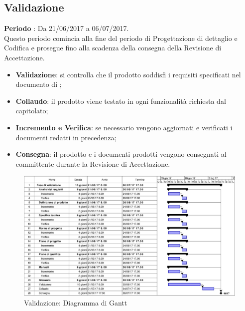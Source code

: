\documentclass[../PianoDiProgetto.tex]{subfiles}
\begin{document}
		\subsection{Validazione}
		\textbf{Periodo} : Da 21/06/2017 a 06/07/2017. \\
		Questo periodo comincia alla fine del periodo di Progettazione di dettaglio e Codifica e prosegue fino alla scadenza della consegna della Revisione di Accettazione.
		\begin{itemize}
			\item \textbf{Validazione}: si controlla che il prodotto soddisfi i requisiti specificati nel documento di \analisideirequisiti ;
			\item \textbf{Collaudo}: il prodotto viene testato in ogni funzionalità richiesta dal capitolato;
			\item \textbf{Incremento e Verifica}: se necessario vengono aggiornati e verificati i documenti redatti in precedenza;
			\item \textbf{Consegna}: il prodotto e i documenti prodotti vengono consegnati al committente durante la Revisione di Accettazione.
		\end{itemize}
		\begin{figure}[H]
			\centering
			\includegraphics[scale=0.55]{Figures/Gantt_Validazione.jpg}
			\caption{Validazione: Diagramma di Gantt}
		\end{figure}
			
\end{document}
